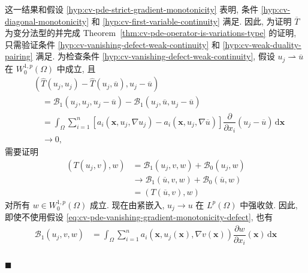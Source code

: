 \begingroup
\renewcommand{\endProof}{\par\nobreak\hfill$\blacksquare$\par\vspace{0.1cm}}
\begingroup
\renewenvironment{Proof}{\par}{\par\nobreak\hfill$\blacksquare$\par\vspace{0.1cm}}
\begin{Proof}
这一结果和假设 \ref{hyp:cv-pde-strict-gradient-monotonicity} 表明, 条件 \ref{hyp:cv-diagonal-monotonicity} 和 \ref{hyp:cv-first-variable-continuity} 满足. 因此, 为证明 $\overline T$ 为变分法型的并完成 Theorem~\ref{thm:cv-pde-operator-is-variations-type} 的证明, 只需验证条件 \ref{hyp:cv-vanishing-defect-weak-continuity} 和 \ref{hyp:cv-weak-duality-pairing} 满足. 为检查条件 \ref{hyp:cv-vanishing-defect-weak-continuity}, 假设 $u_j\rightharpoonup\overline u$ 在 $W_0^{1,p}(\Omega)$ 中成立, 且
\begin{equation}\label{eq:cv-pde-vanishing-gradient-monotonicity-defect}
\begin{aligned}
&(\widehat T(u_j,u_j)-\widehat T(u_j,\overline u),u_j-\overline u)\\
&\quad=\mathcal{B}_1(u_j,u_j,u_j-\overline u)-\mathcal{B}_1(u_j,\overline u,u_j-\overline u)\\
&\quad=\int_\Omega\sum_{i=1}^n[a_i(\bm{x},u_j,\nabla u_j)-a_i(\bm{x},u_j,\nabla\overline u)]\dfrac{\partial}{\partial x_i}(u_j-\overline u)\,\mathrm{d}\bm{x}\\
&\quad\to0,
\end{aligned}
\end{equation}
需要证明
\begin{equation}\label{eq:cv-pde-source-unhatted-test-operator-limit}
\begin{aligned}(T(u_j,v),w)&=\mathcal{B}_1(u_j,v,w)+\mathcal{B}_0(u_j,w)\\&\to\mathcal{B}_1(\overline u,v,w)+\mathcal{B}_0(\overline u,w)\\&=(T(\overline u,v),w)\end{aligned}
\end{equation}
对所有 $w\in W_0^{1,p}(\Omega)$ 成立. 现在由紧嵌入, $u_j\to u$ 在 $L^p(\Omega)$ 中强收敛. 因此, 即使不使用假设 \eqref{eq:cv-pde-vanishing-gradient-monotonicity-defect}, 也有\[\begin{aligned}
\mathcal{B}_1(u_j,v,w)&=\int_\Omega\sum_{i=1}^na_i(\bm{x},u_j(\bm{x}),\nabla v(\bm{x}))\dfrac{\partial w}{\partial x_i}(\bm{x})\,\mathrm{d}\bm{x}\\

\end{aligned}\]
\end{Proof}
